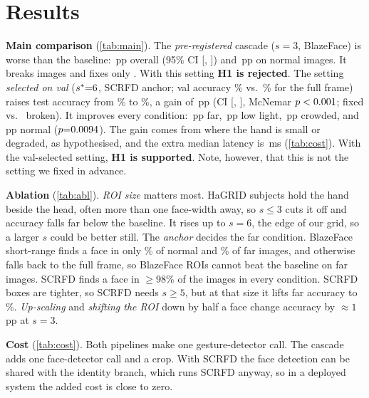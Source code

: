 \section{Results}
\label{sec:results}



\noindent\textbf{Main comparison} (\cref{tab:main}). The \emph{pre-registered} cascade ($s{=}3$, BlazeFace)
is worse than the baseline: \mpSAllD\,pp overall (95\% CI [\mpSAllLo, \mpSAllHi]) and \mpSNorD\,pp on normal
images. It breaks \mpSAllBrk{} images and fixes only \mpSAllFix. With this setting \textbf{H1 is rejected}. The
setting \emph{selected on val} ($s^*{=}6$, SCRFD anchor; val accuracy \mpValSSixscrfd\% vs.\
\mpValfull\% for the full frame) raises test accuracy from \mpBaseAllAcc\% to \mpTAllAcc\%, a gain of
\mpTAllD\,pp (CI [\mpTAllLo, \mpTAllHi], McNemar $p<0.001$; \mpTAllFix{} fixed vs.\ \mpTAllBrk{} broken). It
improves every condition: \mpTFarD\,pp far, \mpTLowD\,pp low light, \mpTCroD\,pp crowded, and \mpTNorD\,pp normal
($p{=}0.0094$). The gain comes from where the hand is small or degraded, as hypothesised, and the extra median
latency is \latExtramediapipe\,ms (\cref{tab:cost}). With the val-selected setting, \textbf{H1 is supported}.
Note, however, that this is not the setting we fixed in advance.



\noindent\textbf{Ablation} (\cref{tab:abl}). \emph{ROI size} matters most. HaGRID subjects hold the hand beside
the head, often more than one face-width away, so $s{\le}3$ cuts it off and accuracy falls far below the
baseline. It rises up to $s{=}6$, the edge of our grid, so a larger $s$ could be better still.
The \emph{anchor} decides the far condition. BlazeFace short-range finds a face in only \mpFaceSThreeUpnormal\% of
normal and \mpFaceSThreeUpfar\% of far images, and otherwise falls back to the full frame, so BlazeFace ROIs
cannot beat the baseline on far images. SCRFD finds a face in $\geq$98\% of the images in every condition.
SCRFD boxes are tighter, so SCRFD needs $s{\ge}5$, but at that size it lifts far accuracy to
\mpAccFarSSixUpScrfd\%.
\emph{Up-scaling} and \emph{shifting the ROI} down by half a face change accuracy by ${\approx}1$\,pp at $s{=}3$.




\noindent\textbf{Cost} (\cref{tab:cost}). Both pipelines make one gesture-detector call. The cascade adds one
face-detector call and a crop. With SCRFD the face detection can be shared with the identity branch, which runs
SCRFD anyway, so in a deployed system the added cost is close to zero.

